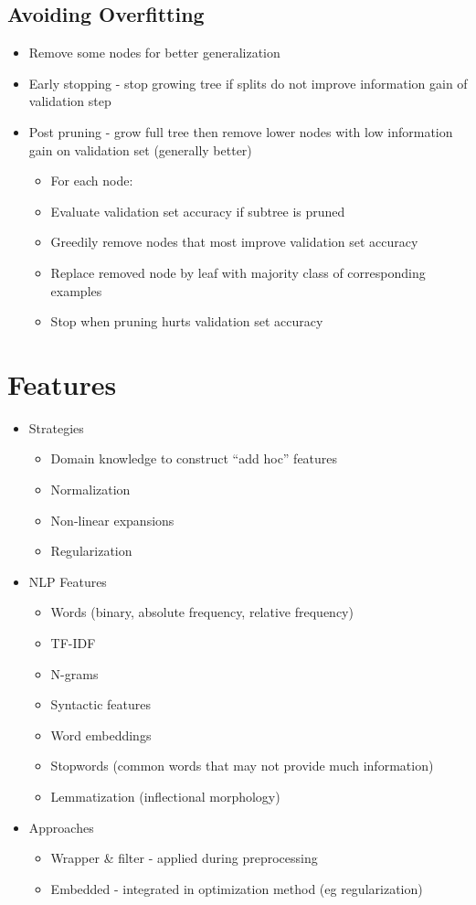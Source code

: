 \documentclass[12pt]{article}
\begin{document}
\subsection{Avoiding Overfitting}

\begin{itemize}
	\item Remove some nodes for better generalization 
	\item Early stopping - stop growing tree if splits do not improve information gain of validation step 
	\item Post pruning - grow full tree then remove lower nodes with low information gain on validation set (generally better)
	\begin{itemize}
		\item For each node:
		\item Evaluate validation set accuracy if subtree is pruned 
		\item Greedily remove nodes that most improve validation set accuracy 
		\item Replace removed node by leaf with majority class of corresponding examples 
		\item Stop when pruning hurts validation set accuracy
	\end{itemize}
\end{itemize}

\section{Features}

\begin{itemize}
	\item Strategies
	\begin{itemize}
		\item Domain knowledge to construct ``add hoc'' features 
		\item Normalization 
		\item Non-linear expansions 
		\item Regularization
	\end{itemize}
	\item NLP Features
	\begin{itemize}
		\item Words (binary, absolute frequency, relative frequency)
		\item TF-IDF 
		\item N-grams
		\item Syntactic features
		\item Word embeddings
		\item Stopwords (common words that may not provide much information)
		\item Lemmatization (inflectional morphology)
	\end{itemize}
	\item Approaches
	\begin{itemize}
		\item Wrapper \& filter - applied during preprocessing
		\item Embedded - integrated in optimization method (eg regularization)
	\end{itemize}
\end{itemize}
\end{document}

